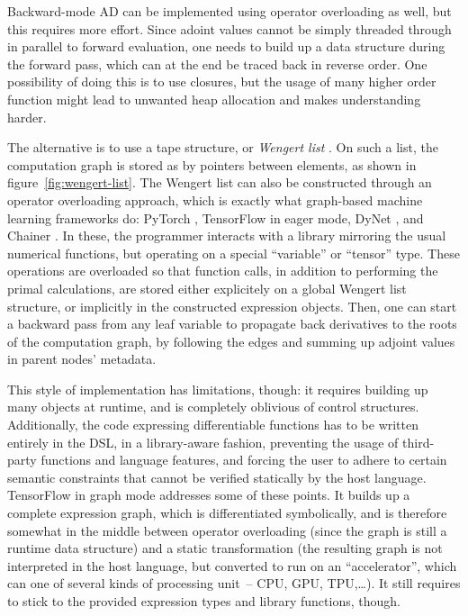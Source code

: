 Backward-mode AD can be implemented using operator overloading as well, but this requires more
effort.  Since adoint values cannot be simply threaded through in parallel to forward evaluation,
one needs to build up a data structure during the forward pass, which can at the end be traced back
in reverse order.  One possibility of doing this is to use closures, but the usage of many higher
order function might lead to unwanted heap allocation and makes understanding harder.

The alternative is to use a tape structure, or \emph{Wengert list} \parencite[][section
3]{baydin2018automatic}.  On such a list, the computation graph is stored as by pointers between
elements, as shown in figure~\ref{fig:wengert-list}.  The Wengert list can also be constructed
through an operator overloading approach, which is exactly what graph-based machine learning
frameworks do: PyTorch \parencite{paszke2017automatic}, TensorFlow \parencite{abadi2015tensorflow}
in eager mode, DyNet \parencite{neubig2017dynet}, and Chainer \parencite{tokui2015chainer}.  In
these, the programmer interacts with a library mirroring the usual numerical functions, but
operating on a special \enquote{variable} or \enquote{tensor} type.  These operations are overloaded
so that function calls, in addition to performing the primal calculations, are stored either
explicitely on a global Wengert list structure, or implicitly in the constructed expression objects.
Then, one can start a backward pass from any leaf variable to propagate back derivatives to the
roots of the computation graph, by following the edges and summing up adjoint values in parent
nodes' metadata.

This style of implementation has limitations, though: it requires building up many objects at
runtime, and is completely oblivious of control structures.  Additionally, the code expressing
differentiable functions has to be written entirely in the DSL, in a library-aware fashion,
preventing the usage of third-party functions and language features, and forcing the user to adhere
to certain semantic constraints that cannot be verified statically by the host language.  TensorFlow
in graph mode addresses some of these points.  It builds up a complete expression graph, which is
differentiated symbolically, and is therefore somewhat in the middle between operator overloading
(since the graph is still a runtime data structure) and a static transformation (the resulting graph
is not interpreted in the host language, but converted to run on an \enquote{accelerator}, which can
one of several kinds of processing unit~-- CPU, GPU, TPU,\ldots).  It still requires to stick to the
provided expression types and library functions, though.

